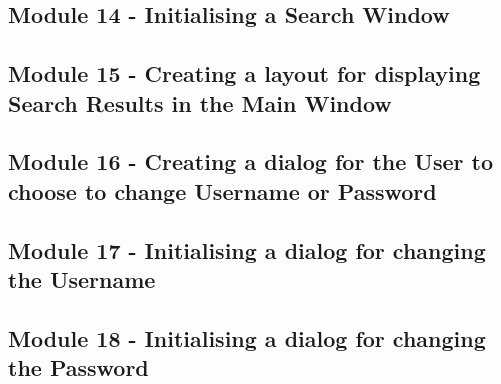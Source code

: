 \begin{landscape}
\begin{scriptsize}

\subsection{Module 14 - Initialising a Search Window}

 \label{ssec:SearchDatabase.py}

\subsection{Module 15 - Creating a layout for displaying Search Results in the Main Window}


\subsection{Module 16 - Creating a dialog for the User to choose to change Username or Password}


\subsection{Module 17 - Initialising a dialog for changing the Username}

 \label{ssec:ChangeUsername.py}

\subsection{Module 18 - Initialising a dialog for changing the Password}

 \label{ssec:ChangePassword.py}
\end{scriptsize}
\end{landscape}






